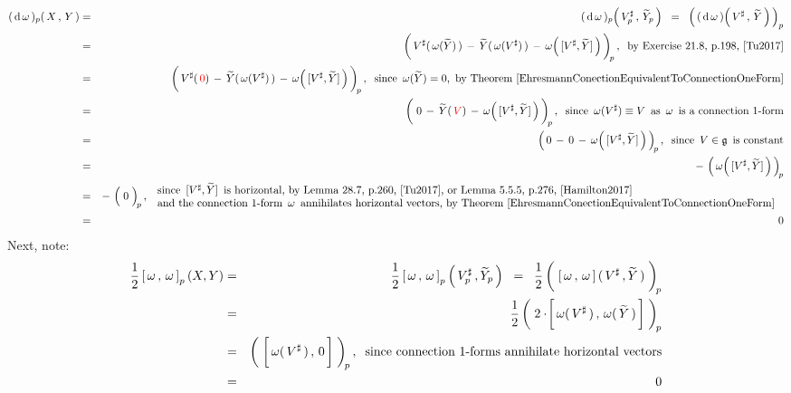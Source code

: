\begin{eqnarray*}
(\,\d\,\omega\,)_{p}\!\left(\,X\,,\,Y\,\right)
& = &
	(\,\d\,\omega\,)_{p}\!\left(\,V^{\sharp}_{p}\,,\,\widetilde{Y}_{p}\,\right)
\;\; = \;\;
	\left(\,
		(\,\overset{{\color{white}.}}{\d\,\omega}\,)\!\left(\,V^{\sharp}\,,\,\widetilde{Y}\,\right)
		\,\right)_{p}
\\
& = &
	\left(\,
		\overset{{\color{white}.}}{V^{\sharp}(\,\omega(\widetilde{Y})\,)}
		\,-\,
		\widetilde{Y}(\,\omega(V^{\sharp})\,)
		\,-\,
		\omega\!\left(\,[V^{\sharp},\widetilde{Y}]\,\right)
		\,\right)_{\!p},
	\;\;
	\textnormal{by Exercise 21.8, p.198, \cite{Tu2017}}
\\
& = &
	\left(\,
		\overset{{\color{white}.}}{V^{\sharp}(\,{\color{red}0})}
		\,-\,
		\widetilde{Y}(\,\omega(V^{\sharp})\,)
		\,-\,
		\omega\!\left(\,[V^{\sharp},\widetilde{Y}]\,\right)
		\,\right)_{\!p},
	\;\;
	\textnormal{since \,$\omega(\widetilde{Y}) = 0$,\,
	by Theorem \ref{EhresmannConectionEquivalentToConnectionOneForm}}
\\
& = &
	\left(\;
		\overset{{\color{white}1}}{0}
		\,-\,
		\widetilde{Y}(\,{\color{red}V})
		\,-\,
		\omega\!\left(\,[V^{\sharp},\widetilde{Y}]\,\right)
		\,\right)_{\!p},
	\;\;
	\textnormal{since \,$\omega(V^{\sharp}) \equiv V$\, as \,$\omega$\, is a connection $1$-form}
\\
& = &
	\left(\,
		0
		\,-\,
		0
		\,-\,
		\omega\!\left(\,[V^{\sharp},\widetilde{Y}]\,\right)
		\,\right)_{\!p},
	\;\;
	\textnormal{since \,$V \in \mathfrak{g}$\, is constant}
\\
& = &
	-\,\left(\,
		\omega\!\left(\,[V^{\sharp},\widetilde{Y}]\,\right)
		\,\right)_{\!p}
\\
& = &
	-\,\left(\;
		\overset{{\color{white}.}}{0}
		\;\right)_{\!p},
	\begin{array}{l}
	\textnormal{
		since \,$[V^{\sharp},\widetilde{Y}]$\, is horizontal,
		by Lemma 28.7, p.260, \cite{Tu2017}, or Lemma 5.5.5, p.276, \cite{Hamilton2017}
		}
	\\
	\textnormal{
		and the connection $1$-form \,$\omega$\, annihilates horizontal vectors,
		by Theorem \ref{EhresmannConectionEquivalentToConnectionOneForm}
		}
	\end{array}
\\
& = &
	0
\end{eqnarray*}
Next, note:
\begin{eqnarray*}
\dfrac{1}{2}\left[\,\omega\,,\,\omega\,\right]_{p}(X,Y)
& = &
	\dfrac{1}{2}
	\left[\,\omega\,,\,\omega\,\right]_{p}\left(\,V^{\sharp}_{p}\,,\widetilde{Y}_{p}\,\right)
\;\; = \;\;
	\dfrac{1}{2}\left(\;
		\left[\,\omega\,,\,\omega\,\right](\,\overset{{\color{white}.}}{V^{\sharp}}\,,\widetilde{Y}\,)
		\;\right)_{\!p}
\\
& = &
	\dfrac{1}{2}\left(\;
		2\cdot\!\left[\,\omega(\,\overset{{\color{white}.}}{V^{\sharp}}\,)\,,\,\omega(\,\widetilde{Y}\,)\,\right]
		\;\right)_{\!p}
\\
& = &
	\left(\;
		\left[\,\omega(\,\overset{{\color{white}.}}{V^{\sharp}}\,)\,,\,0\,\right]
		\;\right)_{\!p},
	\;\;
	\textnormal{since connection $1$-forms annihilate horizontal vectors}
\\
& = &
	0
\end{eqnarray*}
